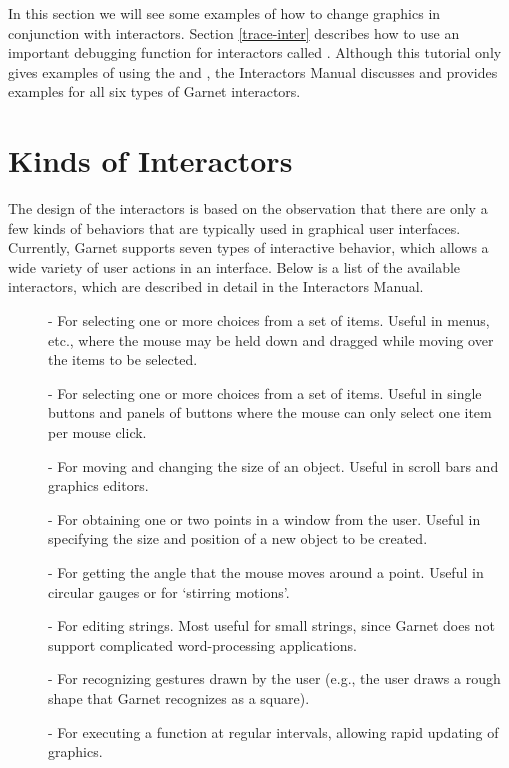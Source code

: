In this section we will see some examples of how to change graphics in
conjunction with interactors.  Section \ref{trace-inter} describes how
to use an important debugging function for interactors called
.   Although this tutorial only gives examples of
using the  and , the
Interactors Manual discusses and provides examples for all six types
of Garnet interactors.


\section{Kinds of Interactors}

The design of the interactors is based on the observation that there
are only a few kinds of behaviors that are typically used in graphical
user interfaces.  Currently, Garnet supports seven types of interactive
behavior, which allows a wide variety of user actions in an interface.
Below is a list of the available interactors, which are described in
detail in the Interactors Manual.

\begin{description}
\item[]  - For selecting one or more choices from a set of
items.  Useful in menus, etc., where the mouse may be held down and
dragged while moving over the items to be selected.

\item[]  - For selecting one or more choices from a set
of items.  Useful in single buttons and panels of buttons where the
mouse can only select one item per mouse click.

\item[]  - For moving and changing the size of an
object.  Useful in scroll bars and graphics editors.

\item[]  - For obtaining one or two points in a
window from the user.  Useful in specifying the size and position of a
new object to be created.

\item[]  - For getting the angle that the mouse moves
around a point.  Useful in circular gauges or for `stirring motions'.

\item[]  - For editing strings.  Most useful for small
strings, since Garnet does not support complicated word-processing
applications.

\item[]  - For recognizing gestures drawn by the user
(e.g., the user draws a rough shape that Garnet recognizes as a square).

\item[]  - For executing a function at regular intervals,
allowing rapid updating of graphics.
\end{description}

